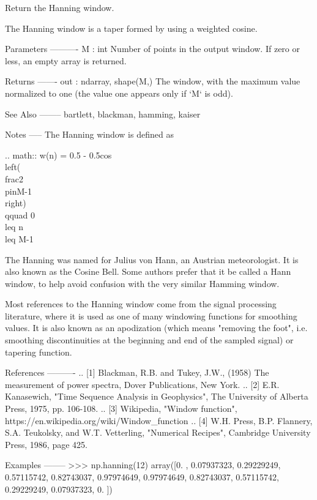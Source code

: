 \begin{DoxyVerb}Return the Hanning window.

The Hanning window is a taper formed by using a weighted cosine.

Parameters
----------
M : int
    Number of points in the output window. If zero or less, an
    empty array is returned.

Returns
-------
out : ndarray, shape(M,)
    The window, with the maximum value normalized to one (the value
    one appears only if `M` is odd).

See Also
--------
bartlett, blackman, hamming, kaiser

Notes
-----
The Hanning window is defined as

.. math::  w(n) = 0.5 - 0.5cos\\left(\\frac{2\\pi{n}}{M-1}\\right)
           \\qquad 0 \\leq n \\leq M-1

The Hanning was named for Julius von Hann, an Austrian meteorologist.
It is also known as the Cosine Bell. Some authors prefer that it be
called a Hann window, to help avoid confusion with the very similar
Hamming window.

Most references to the Hanning window come from the signal processing
literature, where it is used as one of many windowing functions for
smoothing values.  It is also known as an apodization (which means
"removing the foot", i.e. smoothing discontinuities at the beginning
and end of the sampled signal) or tapering function.

References
----------
.. [1] Blackman, R.B. and Tukey, J.W., (1958) The measurement of power
       spectra, Dover Publications, New York.
.. [2] E.R. Kanasewich, "Time Sequence Analysis in Geophysics",
       The University of Alberta Press, 1975, pp. 106-108.
.. [3] Wikipedia, "Window function",
       https://en.wikipedia.org/wiki/Window_function
.. [4] W.H. Press,  B.P. Flannery, S.A. Teukolsky, and W.T. Vetterling,
       "Numerical Recipes", Cambridge University Press, 1986, page 425.

Examples
--------
>>> np.hanning(12)
array([0.        , 0.07937323, 0.29229249, 0.57115742, 0.82743037,
       0.97974649, 0.97974649, 0.82743037, 0.57115742, 0.29229249,
       0.07937323, 0.        ])


\end{DoxyVerb}
